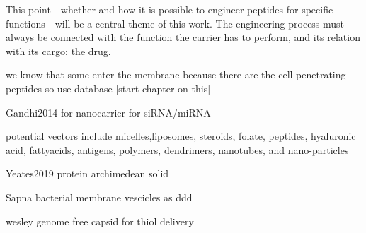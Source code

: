 \documentclass[a4paper,11pt]{extreport}
\begin{document}

This point - whether and how it is possible to engineer peptides for specific functions - will be a central theme of this work. The engineering process must always be connected with the function the carrier has to perform, and its relation with its cargo: the drug.

we know that some enter the membrane because there are the cell penetrating peptides so use database [start chapter on this]

Gandhi2014 for nanocarrier for siRNA/miRNA]

potential vectors include micelles,liposomes, steroids, folate, peptides, hyaluronic acid, fattyacids, antigens, polymers, dendrimers, nanotubes, and nano-particles

Yeates2019 protein archimedean solid

Sapna bacterial membrane vescicles as ddd

wesley genome free capsid for thiol delivery


\printbibliography
\end{document}
